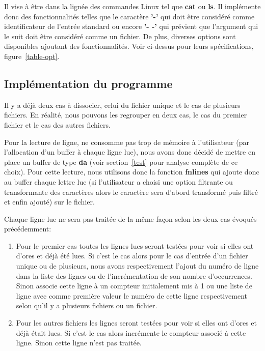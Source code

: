 \documentclass[12pt]{article}
\begin{document}
    Il vise à être dans la lignée des commandes Linux tel que \textbf{cat} ou 
    \textbf{ls}. Il implémente donc des fonctionnalités telles que le caractère 
    \textbf{'-'} qui doit être considéré comme identificateur de l'entrée 
    standard ou encore \textbf{'- -'} qui prévient que l'argument qui le suit 
    doit être considéré comme un fichier. De plus, diverses options sont 
    disponibles ajoutant des fonctionnalités. Voir ci-dessus pour leurs 
    spécifications, figure~\ref{table-opt}.

    \subsection{Implémentation du programme}
    Il y a déjà deux cas à dissocier, celui du fichier unique et le cas de 
    plusieurs fichiers. En réalité, nous pouvons les regrouper en deux 
    cas, le cas du premier fichier et le cas des autres fichiers.

    Pour la lecture de ligne, ne consomme pas trop de mémoire à l'utilisateur
    (par l'allocation d'un buffer à chaque ligne lue), nous avons donc décidé de 
    mettre en place un buffer de type \textbf{da} (voir section~\ref{test} pour
    analyse complète de ce choix). Pour cette lecture, nous utilisons donc la
    fonction \textbf{fnlines} qui ajoute donc au buffer chaque lettre lue (si 
    l'utilisateur a choisi une option filtrante ou transformante des caractères 
    alors le caractère sera d'abord transformé puis filtré et enfin ajouté) 
    sur le fichier.

    Chaque ligne lue ne sera pas traitée de la même façon selon les deux cas 
    évoqués précédemment\@:

    \begin{enumerate}
        \item[] Pour le premier cas toutes les lignes lues seront testées pour 
        voir si elles ont d'ores et déjà été lues. Si c'est le cas alors pour le 
        cas d'entrée d'un fichier unique ou de plusieurs, nous avons 
        respectivement l'ajout du numéro de ligne dans la liste des lignes ou 
        de l'incrémentation de son nombre d'occurrences. Sinon associe cette 
        ligne à  un compteur initialement mis à 1 ou une liste de 
        ligne avec comme première valeur le numéro de cette ligne respectivement 
        selon qu'il y a plusieurs fichiers ou un fichier.
        \item[] Pour les autres fichiers les lignes seront testées pour voir si 
        elles ont d'ores et déjà était lues. Si c'est le cas alors incrémente le 
        compteur associé à cette ligne. Sinon cette ligne n'est pas traitée.
    \end{enumerate}
\end{document}
